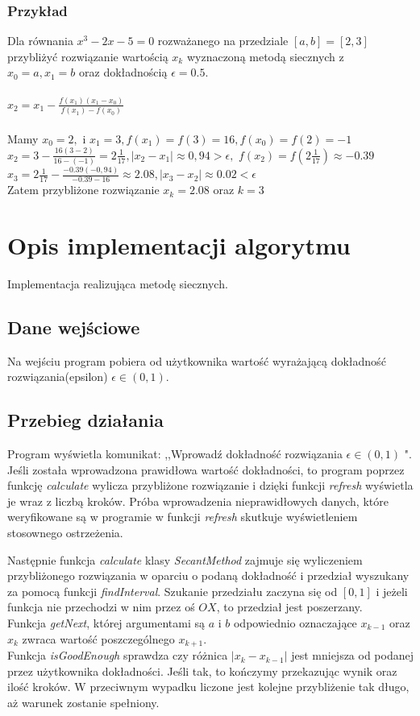 \documentclass[12pt]{article}
\begin{document}
\subsubsection{Przykład}
Dla równania $x^3-2x-5=0$ rozważanego na przedziale $[a,b]=[2,3]$ przybliżyć rozwiązanie wartością $x_k$ wyznaczoną metodą siecznych z\\
$x_0=a, x_1=b$ oraz dokładnością $\epsilon = 0.5.$
\\ \\
$ x_2=x_1 - \frac{f(x_1)(x_1-x_{0})}{f(x_1)-f(x_{0})}$
\\ \\
 Mamy $ x_{0}=2,$ i $x_{1}=3, f(x_1)=f(3)=16, f(x_0)=f(2)=-1$
\\$x_2=3-\frac{16(3-2)}{16-(-1)}=2 \frac{1}{17}, |x_2 - x_1|\approx 0,94 > \epsilon,$
$f(x_2)=f(2 \frac{1}{17})\approx-0.39$ $x_3=2 \frac{1}{17}-\frac{-0.39(-0,94)}{-0.39-16}\approx2.08, |x_3 - x_2|\approx 0.02<\epsilon$
\\Zatem przybliżone rozwiązanie $x_k=2.08$ oraz $k=3$
\section{Opis implementacji algorytmu}
Implementacja realizująca metodę siecznych.
\subsection{Dane wejściowe}
Na wejściu program pobiera od użytkownika wartość wyrażającą dokładność rozwiązania(epsilon) $\epsilon \in(0,1).$



\subsection{Przebieg działania}
Program wyświetla komunikat: ,,Wprowadź dokładność rozwiązania $\epsilon \in(0,1)$ ". Jeśli została wprowadzona prawidłowa wartość dokładności, to program poprzez funkcję \emph{calculate} wylicza przybliżone rozwiązanie i dzięki funkcji \emph{refresh} wyświetla je wraz z liczbą kroków.
Próba wprowadzenia nieprawidłowych danych, które weryfikowane są w programie w funkcji \emph{refresh} skutkuje wyświetleniem stosownego ostrzeżenia.
\par Następnie funkcja \emph{calculate} klasy \emph{SecantMethod} zajmuje się wyliczeniem przybliżonego rozwiązania w oparciu o podaną dokładność i przedział wyszukany za pomocą funkcji \emph{findInterval}. Szukanie przedziału zaczyna się od $[0, 1]$ i jeżeli funkcja nie przechodzi w nim przez oś $OX$, to przedział jest poszerzany.\\
Funkcja \emph{getNext}, której argumentami są $a$ i $b$ odpowiednio oznaczające $x_{k-1}$ oraz $x_{k}$ zwraca wartość poszczególnego $x_{k+1}$.
\\
Funkcja \emph{isGoodEnough} sprawdza czy różnica  $|x_k - x_{k-1}|$ jest mniejsza od podanej przez użytkownika dokładności. Jeśli tak, to kończymy przekazując wynik oraz ilość kroków. W przeciwnym wypadku liczone jest kolejne przybliżenie tak długo, aż warunek zostanie spełniony.
\end{document}
